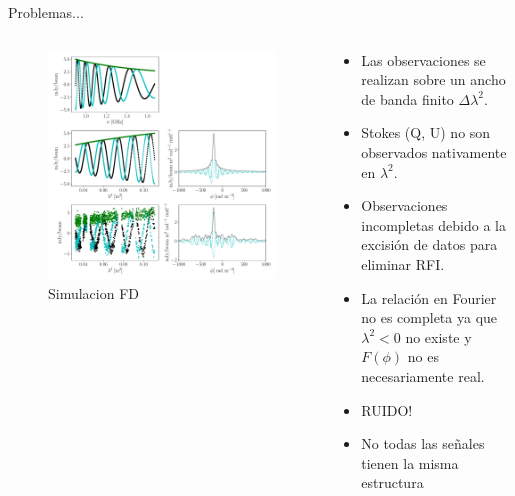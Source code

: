 \documentclass[xetex,aspectratio=169]{beamer}
\begin{document}
	\begin{frame}{Problemas...}
		
		\begin{columns}[onlytextwidth,t]
			\begin{column}{.4\textwidth}
				\begin{figure}
					\centering
					\includegraphics[width=\textwidth, keepaspectratio]{figures/example_ursi.pdf}
					\caption*{Simulacion FD}
				\end{figure}
			\end{column}
			\begin{column}{.6\textwidth}
				\begin{itemize}
					\item Las observaciones se realizan sobre un ancho de banda finito $\Delta \lambda^2$.
					\item Stokes (Q, U) no son observados nativamente en $\lambda^2$.
					\item Observaciones incompletas debido a la excisión de datos para eliminar RFI.
					\item La relación en Fourier no es completa ya que $\lambda^2 < 0 $	no existe y $F(\phi)$ no es necesariamente real.
					\item \alert{RUIDO!}
					\item No todas las señales tienen la misma estructura %
				\end{itemize}
			\end{column}
		\end{columns}
		
	\end{frame}
\end{document}

